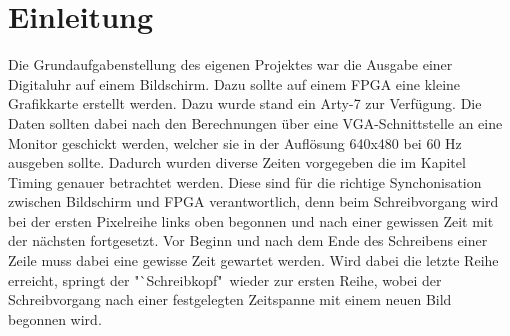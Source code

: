\documentclass[12pt,a4paper,bibliography=totoc,listof=totoc]{scrartcl}
\begin{document}

\renewcommand{\sectionmark}[1]{\markright{#1}}
\renewcommand{\subsectionmark}[1]{}
\renewcommand{\subsubsectionmark}[1]{}
\rhead{\rightmark}

{}
\renewcommand{\thesection}{\arabic{section}}
\renewcommand{\theHsection}{\arabic{section}}
\setcounter{section}{0}
\setcounter{page}{1}

\section{Einleitung}
Die Grundaufgabenstellung des eigenen Projektes war die Ausgabe einer Digitaluhr auf einem Bildschirm. Dazu sollte auf einem FPGA eine kleine 
Grafikkarte erstellt werden. Dazu wurde stand ein Arty-7 zur Verfügung. Die Daten sollten dabei nach den Berechnungen über eine VGA-Schnittstelle 
an eine Monitor geschickt werden, welcher sie in der Auflösung  640x480 bei 60 Hz ausgeben sollte. Dadurch wurden diverse Zeiten vorgegeben die im Kapitel Timing genauer betrachtet werden.
Diese sind für die richtige Synchonisation zwischen Bildschirm und FPGA verantwortlich, denn beim Schreibvorgang wird bei der ersten Pixelreihe links 
oben begonnen und nach einer gewissen Zeit mit der nächsten fortgesetzt. Vor Beginn und nach dem Ende des Schreibens einer Zeile muss dabei eine gewisse Zeit gewartet werden. 
Wird dabei die letzte Reihe erreicht, springt der "`Schreibkopf"\, wieder zur 
ersten Reihe, wobei der Schreibvorgang nach einer festgelegten Zeitspanne mit einem neuen Bild begonnen wird.
\end{document}
